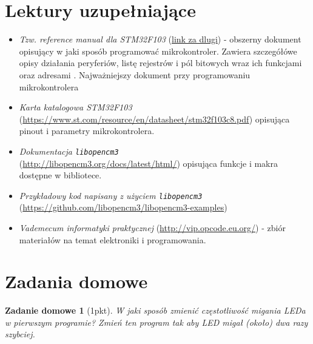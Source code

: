\documentclass{pdfBooklets}
\begin{document}
\section{Lektury uzupełniające}
\begin{itemize}

\item \emph{Tzw. \textit{reference manual} dla STM32F103} (\url{link za dlugi}) - obszerny dokument opisujący w jaki sposób programować
  mikrokontroler. Zawiera szczegółówe opisy działania peryferiów, listę rejestrów i pól bitowych wraz ich funkcjami oraz
  adresami \footnotemark. Najważniejszy dokument przy programowaniu mikrokontrolera
  

\item \emph{Karta katalogowa STM32F103}\\ (\url{https://www.st.com/resource/en/datasheet/stm32f103c8.pdf}) opisująca pinout i
  parametry mikrokontrolera.

\item \emph{Dokumentacja \Verb$libopencm3$}\\ (\url{http://libopencm3.org/docs/latest/html/}) opisująca funkcje i makra dostępne
  w bibliotece.
  
\item \emph{Przykładowy kod napisany z użyciem \Verb$libopencm3$} (\url{https://github.com/libopencm3/libopencm3-examples}) 
  
\item \emph{Vademecum informatyki praktycznej} (\url{http://vip.opcode.eu.org/}) - zbiór materiałów na temat elektroniki i programowania.

\end{itemize}




\clearpage
\section{Zadania domowe}
\newtheorem{ZadanieDomowe}{Zadanie domowe}

\begin{ZadanieDomowe} [1pkt]
W jaki sposób zmienić częstotliwość migania LEDa w pierwszym programie? Zmień ten program tak aby LED migał (około) dwa razy szybciej.
\end{ZadanieDomowe}
\end{document}
